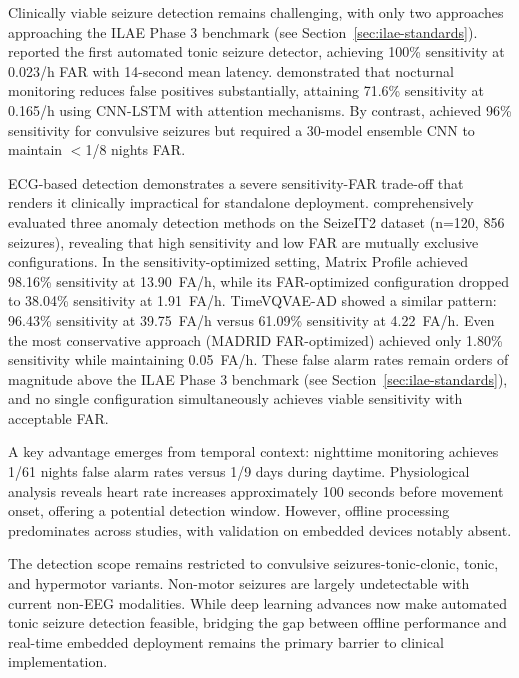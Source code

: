 Clinically viable seizure detection remains challenging, with only two approaches approaching the ILAE Phase 3 benchmark (see Section~\ref{sec:ilae-standards}). \parencite{fineDetectionKeyAutomated2025} reported the first automated tonic seizure detector, achieving 100\% sensitivity at 0.023/h FAR with 14-second mean latency. \parencite{dongDetectionNocturnalEpileptic2026} demonstrated that nocturnal monitoring reduces false positives substantially, attaining 71.6\% sensitivity at 0.165/h using CNN-LSTM with attention mechanisms. By contrast, \parencite{spahrDeepLearningbasedDetection2025} achieved 96\% sensitivity for convulsive seizures but required a 30-model ensemble CNN to maintain $<$1/8 nights FAR.

ECG-based detection demonstrates a severe sensitivity-FAR trade-off that renders it clinically impractical for standalone deployment. \parencite{reintjesECGBasedDetectionEpileptic2025} comprehensively evaluated three anomaly detection methods on the SeizeIT2 dataset (n=120, 856 seizures), revealing that high sensitivity and low FAR are mutually exclusive configurations. In the sensitivity-optimized setting, Matrix Profile achieved 98.16\% sensitivity at 13.90~FA/h, while its FAR-optimized configuration dropped to 38.04\% sensitivity at 1.91~FA/h. TimeVQVAE-AD showed a similar pattern: 96.43\% sensitivity at 39.75~FA/h versus 61.09\% sensitivity at 4.22~FA/h. Even the most conservative approach (MADRID FAR-optimized) achieved only 1.80\% sensitivity while maintaining 0.05~FA/h. These false alarm rates remain orders of magnitude above the ILAE Phase 3 benchmark (see Section~\ref{sec:ilae-standards}), and no single configuration simultaneously achieves viable sensitivity with acceptable FAR.

A key advantage emerges from temporal context: nighttime monitoring achieves 1/61 nights false alarm rates versus 1/9 days during daytime. Physiological analysis reveals heart rate increases approximately 100 seconds before movement onset, offering a potential detection window. However, offline processing predominates across studies, with validation on embedded devices notably absent.

The detection scope remains restricted to convulsive seizures-tonic-clonic, tonic, and hypermotor variants. Non-motor seizures are largely undetectable with current non-EEG modalities. While deep learning advances now make automated tonic seizure detection feasible, bridging the gap between offline performance and real-time embedded deployment remains the primary barrier to clinical implementation.

